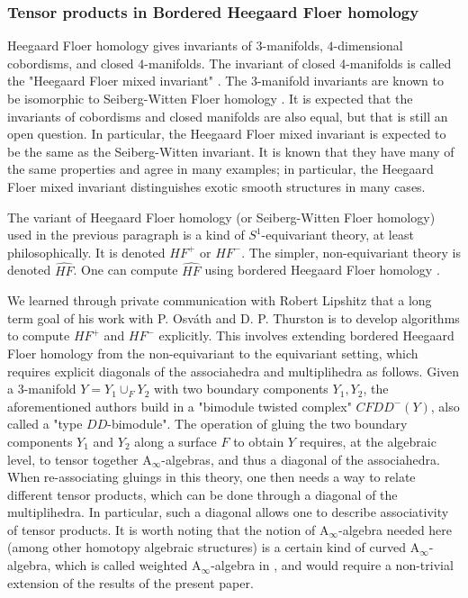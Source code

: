 \documentclass[twoside, 12pt]{amsart}
\theoremstyle{remark}
\newcommand{\Ainf}{\mathrm{A}_\infty} %
\begin{document}
\subsubsection{Tensor products in Bordered Heegaard Floer homology}

Heegaard Floer homology gives invariants of $3$-manifolds, $4$-dimensional cobordisms, and closed $4$-manifolds. 
The invariant of closed 4-manifolds is called the "Heegaard Floer mixed invariant" \cite{OsvathSzabo06}. 
The $3$-manifold invariants are known to be isomorphic to Seiberg-Witten Floer homology \cite{KutluhanLeeTaubes20,ColinGhigginiHonda11}.
It is expected that the invariants of cobordisms and closed manifolds are also equal, but that is still an open question. 
In particular, the Heegaard Floer mixed invariant is expected to be the same as the Seiberg-Witten invariant. 
It is known that they have many of the same properties and agree in many examples; in particular, the Heegaard Floer mixed invariant distinguishes exotic smooth structures in many cases.

The variant of Heegaard Floer homology (or Seiberg-Witten Floer homology) used in the previous paragraph is a kind of $S^1$-equivariant theory, at least philosophically. 
It is denoted $HF^{+}$ or $HF^{-}$. 
The simpler, non-equivariant theory is denoted $\widehat{HF}$. 
One can compute $\widehat{HF}$ using bordered Heegaard Floer homology \cite{LOT14}.

We learned through private communication with Robert Lipshitz that a long term goal of his work with P. Osv\'ath and D. P. Thurston is to develop algorithms to compute $HF^{+}$ and $HF^{-}$ explicitly. 
This involves extending bordered Heegaard Floer homology from the non-equivariant to the equivariant setting, which requires explicit diagonals of the associahedra and multiplihedra as follows. 
Given a 3-manifold $Y=Y_1 \cup_F Y_2$ with two boundary components $Y_1,Y_2$, the aforementioned authors build in \cite{LOT20} a "bimodule twisted complex" $CFDD^{-}(Y)$, also called a "type $DD$-bimodule".
The operation of gluing the two boundary components $Y_1$ and $Y_2$ along a surface $F$ to obtain $Y$ requires, at the algebraic level, to tensor together $\Ainf$-algebras, and thus a diagonal of the associahedra.
When re-associating gluings in this theory, one then needs a way to relate different tensor products, which can be done through a diagonal of the multiplihedra.
In particular, such a diagonal allows one to describe associativity of tensor products. 
It is worth noting that the notion of $\Ainf$-algebra needed here (among other homotopy algebraic structures) is a certain kind of curved $\Ainf$-algebra, which is called weighted $\Ainf$-algebra in \cite{LOT20}, and would require a non-trivial extension of the results of the present paper. 
\end{document}

